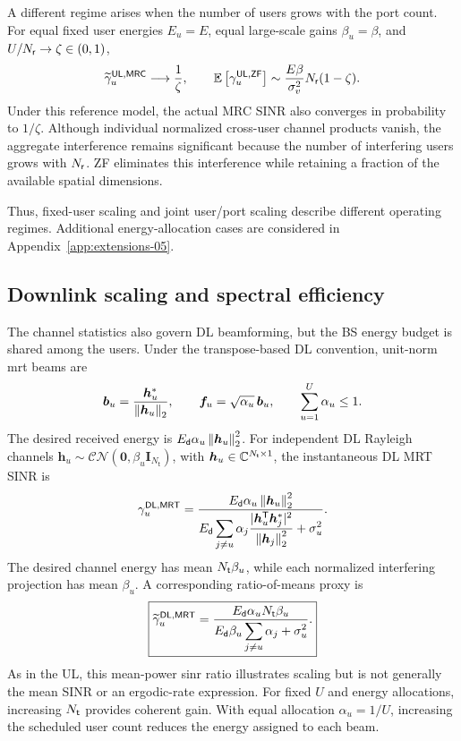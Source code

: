 A different regime arises when the number of users grows with the port count. For equal fixed user energies $E_u=E$, equal large-scale gains $\beta_u=\beta$, and $U/N_{\mathsf{r}}\to\zeta\in(0,1)$,
\begin{equation}
	\widetilde\gamma_u^{\mathsf{UL},\mathsf{MRC}}
	\longrightarrow\frac{1}{\zeta},
	\qquad
	\mathbb{E}\left[\gamma_u^{\mathsf{UL},\mathsf{ZF}}\right]
	\sim\frac{E\beta}{\sigma_v^2}N_{\mathsf{r}}(1-\zeta).
	\label{eq:jointscaling-05}
\end{equation}
Under this reference model, the actual MRC SINR also converges in probability to $1/\zeta$. Although individual normalized cross-user channel products vanish, the aggregate interference remains significant because the number of interfering users grows with $N_{\mathsf{r}}$. ZF eliminates this interference while retaining a fraction of the available spatial dimensions.

Thus, fixed-user scaling and joint user/port scaling describe different operating regimes. Additional energy-allocation cases are considered in Appendix~\ref{app:extensions-05}.

\subsection{Downlink scaling and spectral efficiency}
The channel statistics also govern DL beamforming, but the BS energy budget is shared among the users. Under the transpose-based DL convention, unit-norm \ac{mrt} beams are
\begin{equation*}
	\bm{b}_u=\frac{{\bm{h}}^{*}_u}{\left\|\bm{h}_u\right\|_2},
	\qquad
	\bm{f}_u=\sqrt{\alpha_u}\,\bm{b}_u,
	\qquad
	\sum_{u=1}^{U}\alpha_u\leq1.
\end{equation*}
The desired received energy is $E_{\mathsf{d}}\alpha_u\left\|\bm{h}_u\right\|_2^2$. For independent DL Rayleigh channels \(\mathbf h_u\sim\mathcal{CN}(\mathbf0,\beta_u\mathbf I_{N_{\mathsf t}})\),  with $\bm{h}_u\in\mathbb{C}^{N_{\mathsf{t}}\times1}$, the instantaneous DL MRT SINR is
\begin{equation}
	\gamma_u^{\mathsf{DL},\mathsf{MRT}}
	=\frac{E_{\mathsf{d}}\alpha_u\left\|\bm{h}_u\right\|_2^2}
	{\displaystyle E_{\mathsf{d}}\sum_{j\ne u}\alpha_j
		\frac{|{\bm{h}}^{\mathsf{T}}_u{\bm{h}}^{*}_j|^2}
		{\left\|\bm{h}_j\right\|_2^2}
		+\sigma_u^2}.
	\label{eq:mrtinstant-05}
\end{equation}
The desired channel energy has mean $N_{\mathsf{t}}\beta_u$, while each normalized interfering projection has mean $\beta_u$. A corresponding ratio-of-means proxy is
\begin{equation}
	\boxed{
		\widetilde\gamma_u^{\mathsf{DL},\mathsf{MRT}}
		=\frac{E_{\mathsf{d}}\alpha_uN_{\mathsf{t}}\beta_u}
		{\displaystyle E_{\mathsf{d}}\beta_u\sum_{j\ne u}\alpha_j+\sigma_u^2}.
	}
	\label{eq:mrtproxy-05}
\end{equation}
As in the UL, this mean-power \ac{sinr} ratio illustrates scaling but is not generally the mean SINR or an ergodic-rate expression. For fixed $U$ and energy allocations, increasing $N_{\mathsf{t}}$ provides coherent gain. With equal allocation $\alpha_u=1/U$, increasing the scheduled user count reduces the energy assigned to each beam.

